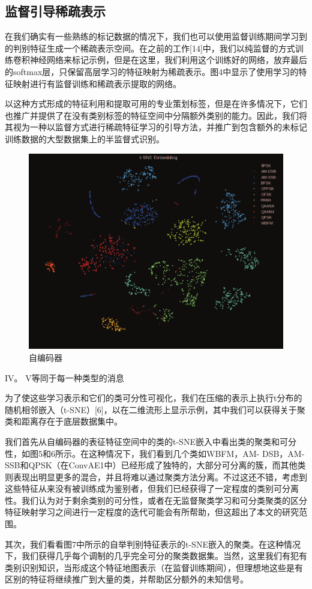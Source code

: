 \subsection{监督引导稀疏表示}
在我们确实有一些熟练的标记数据的情况下，我们也可以使用监督训练期间学习到的判别特征生成一个稀疏表示空间。在之前的工作[14]中，我们以纯监督的方式训练卷积神经网络来标记示例，但是在这里，我们利用这个训练好的网络，放弃最后的softmax层，只保留高层学习的特征映射为稀疏表示。图4中显示了使用学习的特征映射进行有监督训练和稀疏表示提取的网络。\par
以这种方式形成的特征利用和提取可用的专业策划标签，但是在许多情况下，它们也推广并提供了在没有类别标签的特征空间中分隔额外类别的能力。因此，我们将其视为一种以监督方式进行稀疏特征学习的引导方法，并推广到包含额外的未标记训练数据的大型数据集上的半监督式识别。\par
\begin{figure}[!h]
	\centering
	\includegraphics[scale=0.2]{figures/chapter_3/surprised_fea}
	\caption{自编码器}	\label{fig_3_2}
\end{figure}
IV。 V等同于每一种类型的消息\par
为了使这些学习表示和它们的类可分性可视化，我们在压缩的表示上执行t分布的随机相邻嵌入（t-SNE）[6]，以在二维流形上显示示例，其中我们可以获得关于聚类和距离存在于底层数据集中。\par
我们首先从自编码器的表征特征空间中的类的t-SNE嵌入中看出类的聚类和可分性，如图5和6所示。在这种情况下，我们看到几个类如WBFM，AM- DSB，AM-SSB和QPSK（在ConvAE1中）已经形成了独特的，大部分可分离的簇，而其他类则表现出明显更多的混合，并且将难以通过聚类方法分离。不过这还不错，考虑到这些特征从来没有被训练成为鉴别者，但我们已经获得了一定程度的类别可分离性。我们认为对于剩余类别的可分性，或者在无监督聚类学习和可分类聚类的区分特征映射学习之间进行一定程度的迭代可能会有所帮助，但这超出了本文的研究范围。\par
其次，我们看看图7中所示的自举判别特征表示的t-SNE嵌入的聚类。在这种情况下，我们获得几乎每个调制的几乎完全可分的聚类数据集。当然，这里我们有犯有类别识别知识，当形成这个特征地图表示（在监督训练期间），但理想地这些是有区别的特征将继续推广到大量的类，并帮助区分额外的未知信号。\par


